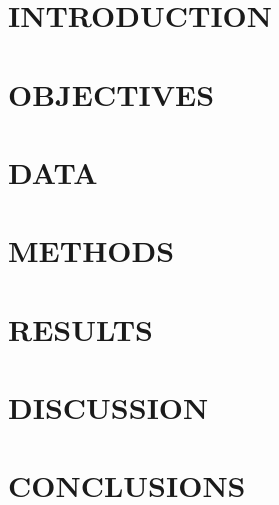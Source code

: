 \documentclass[abstract=true,
              titlepage=true,
              fontsize=12pt, 
              pagesize=auto, 
              DIV=13, BCOR=5mm, 
              headings=normal,
              bibliography=totocnumbered,
              numbers=noenddot,
              parskip=half]{scrartcl}
\begin{document}
\clearpage
\newpage

\setcounter{table}{1} %
\setcounter{figure}{0}
\renewcommand{\angle}{0}

\section{INTRODUCTION}
\label{sec:introduction}



\section{OBJECTIVES}
\label{sec:objectives}



\clearpage

\section{DATA}
\label{sec:data}



\clearpage

\section{METHODS}
\label{sec:methods}



\clearpage

\section{RESULTS}
\label{sec:results}



\clearpage

\section{DISCUSSION}
\label{sec:discussion}



\clearpage

\section{CONCLUSIONS}
\label{sec:conclusion}
\end{document}
